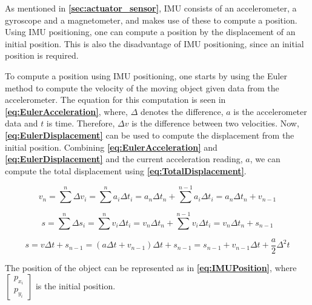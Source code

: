 As mentioned in \textbf{\autoref{sec:actuator_sensor}}, IMU consists of an accelerometer, a gyroscope and a magnetometer, and makes use of these to compute a position. Using IMU positioning, one can compute a position by the displacement of an initial position. This is also the disadvantage of IMU positioning, since an initial position is required.

To compute a position using IMU positioning, one starts by using the Euler method to compute the velocity of the moving object given data from the accelerometer. The equation for this computation is seen in \textbf{\autoref{eq:EulerAcceleration}}, where, $\Delta$ denotes the difference, $a$ is the accelerometer data and $t$ is time. Therefore, $\Delta v$ is the difference between two velocities. Now, \textbf{\autoref{eq:EulerDisplacement}} can be used to compute the displacement from the initial position. Combining \textbf{\autoref{eq:EulerAcceleration}} and \textbf{\autoref{eq:EulerDisplacement}} and the current acceleration reading, $a$, we can compute the total displacement using \textbf{\autoref{eq:TotalDisplacement}}.

\begin{equation} \label{eq:EulerAcceleration}
    v_n = \sum^{n} \Delta v_i = \sum^{n} a_i \Delta t_i = a_n \Delta t_n + \sum^{n - 1} a_i \Delta t_i = a_n \Delta t_n + v_{n - 1}
\end{equation}

\begin{equation} \label{eq:EulerDisplacement}
    s = \sum^{n} \Delta s_i = \sum^{n} v_i \Delta t_i = v_n \Delta t_n + \sum^{n - 1} v_i \Delta t_i = v_n \Delta t_n + s_{n - 1}
\end{equation}

\begin{equation} \label{eq:TotalDisplacement}
    s = v \Delta t + s_{n - 1} = (a \Delta t + v_{n - 1}) \Delta t + s_{n - 1} = s_{n - 1} + v_{n - 1} \Delta t + \frac{a}{2} \Delta^2 t
\end{equation}

The position of the object can be represented as in \textbf{\autoref{eq:IMUPosition}}, where $\begin{bmatrix}p_{x_{i}} \\ p_{y_{i}}\end{bmatrix}$ is the initial position.

